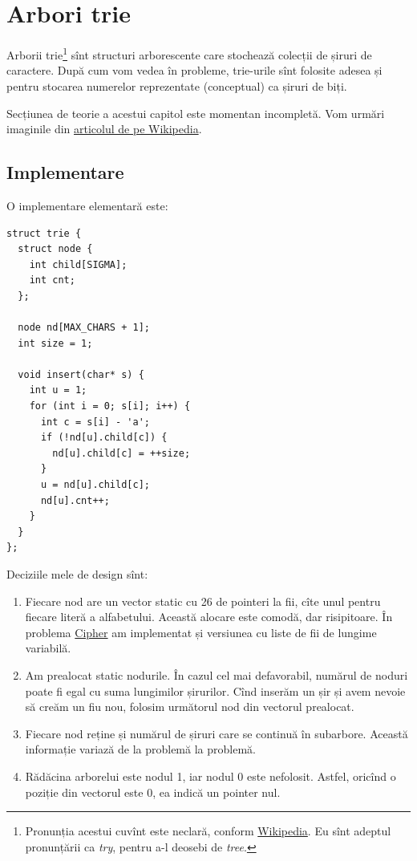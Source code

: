 \documentclass[../main.tex]{subfiles}
\begin{document}
\chapter{Arbori trie}

Arborii trie\footnote{Pronunția acestui cuvînt este neclară, conform \href{https://en.wikipedia.org/wiki/Trie\#History,_etymology,_and_pronunciation}{Wikipedia}. Eu sînt adeptul pronunțării ca \textit{try}, pentru a-l deosebi de \textit{tree}.} sînt structuri arborescente care stochează colecții de șiruri de caractere. După cum vom vedea în probleme, trie-urile sînt folosite adesea și pentru stocarea numerelor reprezentate (conceptual) ca șiruri de biți.

Secțiunea de teorie a acestui capitol este momentan incompletă. Vom urmări imaginile din \href{https://en.wikipedia.org/wiki/Trie}{articolul de pe Wikipedia}.

\section{Implementare}

O implementare elementară este:

\begin{verbatim}
struct trie {
  struct node {
    int child[SIGMA];
    int cnt;
  };

  node nd[MAX_CHARS + 1];
  int size = 1;

  void insert(char* s) {
    int u = 1;
    for (int i = 0; s[i]; i++) {
      int c = s[i] - 'a';
      if (!nd[u].child[c]) {
        nd[u].child[c] = ++size;
      }
      u = nd[u].child[c];
      nd[u].cnt++;
    }
  }
};
\end{verbatim}

Deciziile mele de design sînt:

\begin{enumerate}
  \item Fiecare nod are un vector static cu 26 de pointeri la fii, cîte unul pentru fiecare literă a alfabetului. Această alocare este comodă, dar risipitoare. În problema \hyperref[problem:cipher]{Cipher} am implementat și versiunea cu liste de fii de lungime variabilă.
  \item Am prealocat static nodurile. În cazul cel mai defavorabil, numărul de noduri poate fi egal cu suma lungimilor șirurilor. Cînd inserăm un șir și avem nevoie să creăm un fiu nou, folosim următorul nod din vectorul prealocat.
  \item Fiecare nod reține și numărul de șiruri care se continuă în subarbore. Această informație variază de la problemă la problemă.
  \item Rădăcina arborelui este nodul 1, iar nodul 0 este nefolosit. Astfel, oricînd o poziție din vectorul  este 0, ea indică un pointer nul.
\end{enumerate}
\end{document}
